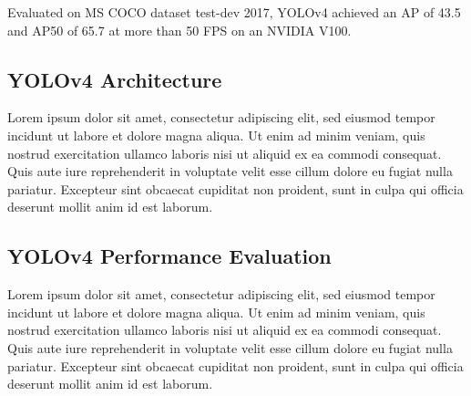 \documentclass{article}
\begin{document}
Evaluated on MS COCO dataset test-dev 2017, YOLOv4 achieved an AP of 43.5 and AP50 of 65.7 at more than 50
FPS on an NVIDIA V100.

\subsection{YOLOv4 Architecture}


Lorem ipsum dolor sit amet, consectetur adipiscing elit, sed eiusmod tempor incidunt ut labore et dolore magna aliqua. Ut enim ad minim veniam, quis nostrud exercitation ullamco laboris nisi ut aliquid ex ea commodi consequat. Quis aute iure reprehenderit in voluptate velit esse cillum dolore eu fugiat nulla pariatur. Excepteur sint obcaecat cupiditat non proident, sunt in culpa qui officia deserunt mollit anim id est laborum.

\subsection{YOLOv4 Performance Evaluation}


Lorem ipsum dolor sit amet, consectetur adipiscing elit, sed eiusmod tempor incidunt ut labore et dolore magna aliqua. Ut enim ad minim veniam, quis nostrud exercitation ullamco laboris nisi ut aliquid ex ea commodi consequat. Quis aute iure reprehenderit in voluptate velit esse cillum dolore eu fugiat nulla pariatur. Excepteur sint obcaecat cupiditat non proident, sunt in culpa qui officia deserunt mollit anim id est laborum.


\end{document}

